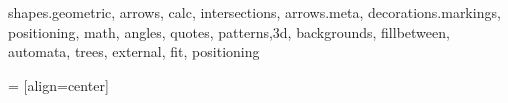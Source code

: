 \usepackage{xcolor}
\usepackage{graphicx}
\usepackage{ifthen}
\usepackage{xifthen}
\usepackage{amssymb,amsmath,amsthm}
\usepackage{pgf,pgfplots,pgfkeys}
\usepackage{tikz}
\usepackage{tkz-euclide}
\usepackage{siunitx} %
\usepackage{caption}

%

\usetikzlibrary
    {
      shapes.geometric,
      arrows,
      calc,
      intersections,
      arrows.meta,
      decorations.markings,
      positioning,
      math,
      angles,
      quotes,
      patterns,3d,
      backgrounds,
      fillbetween,
      automata,
      trees,
      external,
      fit,
      positioning
    }


\makeatletter
\newcommand{\gettikzxy}[3]{%
  \tikz@scan@one@point\pgfutil@firstofone#1\relax
  \edef#2{\the\pgf@x}%
  \edef#3{\the\pgf@y}%
  \tikzmath{#2=#2/28.3465;};
  \tikzmath{#3=#3/28.3465;};
}
 = [align=center]
\makeatother


\pgfplotsset{compat=1.16}



\newcommand\DrawControl[3]{
  node[#2,circle,fill=#2,inner sep=2pt,label={above:$#1$},label={[black]below:{\footnotesize#3}}] at #1 {}
 }

